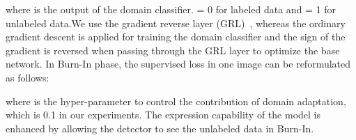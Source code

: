 \documentclass[10pt,twocolumn,letterpaper]{article}
\begin{document}
\noindent
where  is the output of the domain classifier.  = 0 for labeled data and  = 1 for unlabeled data.We use the gradient reverse layer (GRL)~\cite{ganin2015unsupervised}, whereas the ordinary gradient descent is applied for training the domain classifier and the sign of the gradient is reversed when passing through the GRL layer to optimize the base network. In Burn-In phase, the supervised loss in one image can be reformulated as follows:
\begin{small}

\end{small}
\noindent
where  is the hyper-parameter to control
the contribution of domain adaptation, which is 0.1 in our experiments. The expression capability of the model is enhanced by allowing the detector to see the unlabeled data in Burn-In. 
\end{document}
